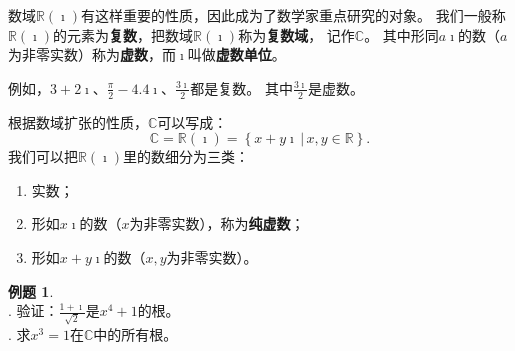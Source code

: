 \documentclass[12pt,UTF8]{ctexbook}
\theoremstyle{definition}
\newtheorem{et}{例题}[section]
\theoremstyle{plain}
\begin{document}
数域$\mathbb{R}(\imath)$有这样重要的性质，因此成为了数学家重点研究的对象。
我们一般称$\mathbb{R}(\imath)$的元素为\textbf{复数}，把数域$\mathbb{R}(\imath)$称为\textbf{复数域}，
记作$\mathbb{C}$。
其中形同$a\imath$的数（$a$为非零实数）称为\textbf{虚数}，而$\imath$叫做\textbf{虚数单位}。

例如，$3 + 2\imath$、$\displaystyle\frac{\pi}{2} - 4.4\imath$、$\displaystyle\frac{3\imath}{2}$都是复数。
其中$\displaystyle\frac{3\imath}{2}$是虚数。

根据数域扩张的性质，$\mathbb{C}$可以写成：
$$\mathbb{C} = \mathbb{R}(\imath) = \left\{\left. x + y\imath \, \right| \, x, y \in \mathbb{R} \right\}. $$
我们可以把$\mathbb{R}(\imath)$里的数细分为三类：
\begin{enumerate}
    \item 实数；
    \item 形如$x\imath$的数（$x$为非零实数），称为\textbf{纯虚数}；
    \item 形如$x + y\imath$的数（$x, y$为非零实数）。
\end{enumerate}

\begin{et}
    \mbox{} \\
    . 验证：$\displaystyle\frac{1 + \imath}{\sqrt{2}}$是$x^4 + 1$的根。\\
    . 求$x^3 = 1$在$\mathbb{C}$中的所有根。
    
\end{et}
\end{document}
